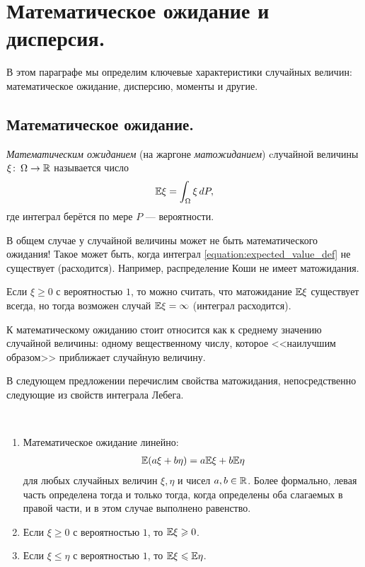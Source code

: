 \documentclass[../main.tex]{subfiles}
\begin{document}
\newpage
\section{Математическое ожидание и дисперсия.}

В этом параграфе мы определим ключевые характеристики случайных величин: математическое ожидание, дисперсию, моменты и другие.

\subsection{Математическое ожидание.}

\begin{df}
 \textit{Математическим ожиданием} (на жаргоне \textit{матожиданием}) cлучайной величины $ \xi \colon \, \Omega \to \mathbb{R} $ называется число
 \begin{align}
  \label{equation:expected_value_def}
  \mathbb E \xi = \int_{\Omega}  \xi\,dP,
 \end{align} где интеграл берётся по мере $ P $ --- вероятности.
\end{df}
\begin{remrk*}
 В общем случае у случайной величины может не быть математического ожидания! Такое может быть, когда интеграл \eqref{equation:expected_value_def} не существует (расходится). Например, распределение Коши не имеет матожидания.

 Если $ \xi \geqslant 0 $ с вероятностью $ 1 $, то можно считать, что матожидание $ \mathbb E \xi $ существует всегда, но тогда возможен случай $ \mathbb E \xi = \infty $ (интеграл расходится).
\end{remrk*}

К математическому ожиданию стоит относится как к среднему значению случайной величины: одному вещественному числу, которое <<наилучшим образом>> приближает случайную величину.

В следующем предложении перечислим свойства матожидания, непосредственно следующие из свойств интеграла Лебега.
\begin{prop}\
 \begin{enumerate}
  \item Математическое ожидание линейно:
   \begin{align*}
    \mathbb E(a\xi + b\eta) = a \mathbb E \xi + b \mathbb E \eta
   \end{align*} для любых случайных величин $ \xi,\eta $ и чисел $ a,b\in \mathbb{R} $. Более формально, левая часть определена тогда и только тогда, когда определены оба слагаемых в правой части, и в этом случае выполнено равенство.
  \item Если $ \xi \geqslant 0 $ с вероятностью $ 1 $, то $ \mathbb E\xi\geqslant 0 $.
  \item Если $ \xi \leqslant \eta $ с вероятностью $ 1 $, то $ \mathbb E\xi \leqslant \mathbb E\eta $.
 \end{enumerate}
\end{prop}
\end{document}
